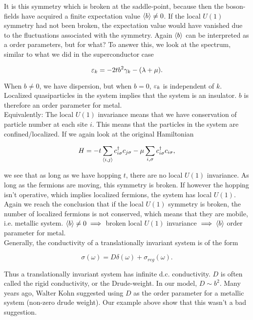 It is this symmetry which is broken at the saddle-point, because then the boson-fields have acquired a finite expectation value $\expval{b} \neq 0$. If the local $U(1)$ symmetry had not been broken, the expectation value would have vanished due to the fluctuations associated with the symmetry. Again $\expval{b}$ can be interpreted as a order parameters, but for what? To answer this, we look at the spectrum, similar to what we did in the superconductor case

\begin{equation*}
    \varepsilon_k = -2tb^2 \gamma_k - (\lambda + \mu). 
\end{equation*}

When $b \neq 0$, we have dispersion, but when $b = 0$, $\varepsilon_k$ is independent of $k$. Localized quasiparticles in the system implies that the system is an insulator. $b$ is therefore an order parameter for metal. \\ 

Equivalently: The local $U(1)$ invariance means that we have conservation of particle number at each site $i$. This means that the particles in the system are confined/localized. If we again look at the original Hamiltonian 

\begin{equation*}
    H = -t \sum_{\expval{i,j}}c_{i\sigma}^\dagger c_{j\sigma} - \mu \sum_{i, \sigma}c_{i\sigma}^\dagger c_{i\sigma},
\end{equation*}

we see that as long as we have hopping $t$, there are no local $U(1)$ invariance. As long as the fermions are moving, this symmetry is broken. If however the hopping isn't operative, which implies localized fermions, the system has local $U(1)$. Again we reach the conclusion that if the local $U(1)$ symmetry is broken, the number of localized fermions is not conserved, which means that they are mobile, i.e. metallic system. $\expval{b} \neq 0 \implies$ broken local $U(1)$ invariance $\implies \expval{b}$ order parameter for metal. \\

Generally, the conductivity of a translationally invariant system is of the form 

\begin{equation*}
    \sigma (\omega) = D\delta (\omega) + \sigma_{reg}(\omega). 
\end{equation*}

Thus a translationally invariant system has infinite d.c. conductivity. $D$ is often called the rigid conductivity, or the Drude-weight. In our model, $D \sim b^2$. Many years ago, Walter Kohn suggested using $D$ as the order parameter for a metallic system (non-zero drude weight). Our example above show that this wasn't a bad suggestion. \\

